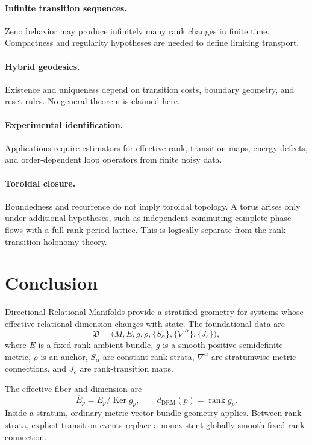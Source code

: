 \documentclass[11pt]{article}
\newcommand{\Ker}{\operatorname{Ker}}
\newcommand{\rank}{\operatorname{rank}}
\begin{document}
\paragraph{Infinite transition sequences.}
Zeno behavior may produce infinitely many rank changes in finite time.
Compactness and regularity hypotheses are needed to define limiting transport.

\paragraph{Hybrid geodesics.}
Existence and uniqueness depend on transition costs, boundary geometry, and
reset rules. No general theorem is claimed here.

\paragraph{Experimental identification.}
Applications require estimators for effective rank, transition maps, energy
defects, and order-dependent loop operators from finite noisy data.

\paragraph{Toroidal closure.}
Boundedness and recurrence do not imply toroidal topology. A torus arises only
under additional hypotheses, such as independent commuting complete phase
flows with a full-rank period lattice. This is logically separate from the
rank-transition holonomy theory.

\section{Conclusion}

Directional Relational Manifolds provide a stratified geometry for systems
whose effective relational dimension changes with state. The foundational
data are
\[
\mathfrak D=
\bigl(M,E,g,\rho,\{S_\alpha\},\{\nabla^\alpha\},\{J_e\}\bigr),
\]
where $E$ is a fixed-rank ambient bundle, $g$ is a smooth
positive-semidefinite metric, $\rho$ is an anchor, $S_\alpha$ are
constant-rank strata, $\nabla^\alpha$ are stratumwise metric connections, and
$J_e$ are rank-transition maps.

The effective fiber and dimension are
\[
\overline E_p=E_p/\Ker g_p,
\qquad
d_{\mathrm{DRM}}(p)=\rank g_p.
\]
Inside a stratum, ordinary metric vector-bundle geometry applies. Between
rank strata, explicit transition events replace a nonexistent globally smooth
fixed-rank connection.
\end{document}
